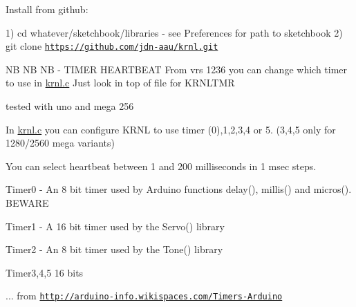 Install from github\+:

1) cd whatever/sketchbook/libraries -\/ see Preferences for path to sketchbook 2) git clone \href{https://github.com/jdn-aau/krnl.git}{\tt https\+://github.\+com/jdn-\/aau/krnl.\+git}

N\+B N\+B N\+B -\/ T\+I\+M\+E\+R H\+E\+A\+R\+T\+B\+E\+A\+T From vrs 1236 you can change which timer to use in \hyperlink{krnl_8c}{krnl.\+c} Just look in top of file for K\+R\+N\+L\+T\+M\+R
\begin{DoxyItemize}
\item tested with uno and mega 256
\end{DoxyItemize}

In \hyperlink{krnl_8c}{krnl.\+c} you can configure K\+R\+N\+L to use timer (0),1,2,3,4 or 5. (3,4,5 only for 1280/2560 mega variants)

You can select heartbeat between 1 and 200 milliseconds in 1 msec steps.


\begin{DoxyItemize}
\item Timer0 -\/ An 8 bit timer used by Arduino functions delay(), millis() and micros(). B\+E\+W\+A\+R\+E
\item Timer1 -\/ A 16 bit timer used by the Servo() library
\item Timer2 -\/ An 8 bit timer used by the Tone() library
\item Timer3,4,5 16 bits
\end{DoxyItemize}

... from \href{http://arduino-info.wikispaces.com/Timers-Arduino}{\tt http\+://arduino-\/info.\+wikispaces.\+com/\+Timers-\/\+Arduino}


